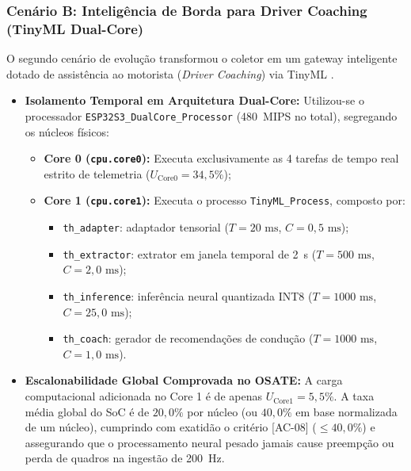 \subsubsection{Cenário B: Inteligência de Borda para Driver Coaching (TinyML Dual-Core)}
O segundo cenário de evolução transformou o coletor em um gateway inteligente dotado de assistência ao motorista (\textit{Driver Coaching}) via TinyML \cite{warden2019tinyml}.
\begin{itemize}
    \item \textbf{Isolamento Temporal em Arquitetura Dual-Core:} Utilizou-se o processador \texttt{ESP32S3\_DualCore\_Processor} (480~MIPS no total), segregando os núcleos físicos:
    \begin{itemize}
        \item \textbf{Core 0 (\texttt{cpu.core0}):} Executa exclusivamente as 4 tarefas de tempo real estrito de telemetria ($U_{\text{Core0}} = 34{,}5\%$);
        \item \textbf{Core 1 (\texttt{cpu.core1}):} Executa o processo \texttt{TinyML\_Process}, composto por:
        \begin{itemize}
            \item \texttt{th\_adapter}: adaptador tensorial ($T=20\text{ ms}$, $C=0{,}5\text{ ms}$);
            \item \texttt{th\_extractor}: extrator em janela temporal de 2~s ($T=500\text{ ms}$, $C=2{,}0\text{ ms}$);
            \item \texttt{th\_inference}: inferência neural quantizada INT8 ($T=1000\text{ ms}$, $C=25{,}0\text{ ms}$);
            \item \texttt{th\_coach}: gerador de recomendações de condução ($T=1000\text{ ms}$, $C=1{,}0\text{ ms}$).
        \end{itemize}
    \end{itemize}
    \item \textbf{Escalonabilidade Global Comprovada no OSATE:} A carga computacional adicionada no Core 1 é de apenas $U_{\text{Core1}} = 5{,}5\%$. A taxa média global do SoC é de $20{,}0\%$ por núcleo (ou $40{,}0\%$ em base normalizada de um núcleo), cumprindo com exatidão o critério [AC-08] ($\le 40{,}0\%$) e assegurando que o processamento neural pesado jamais cause preempção ou perda de quadros na ingestão de 200~Hz.
\end{itemize}



